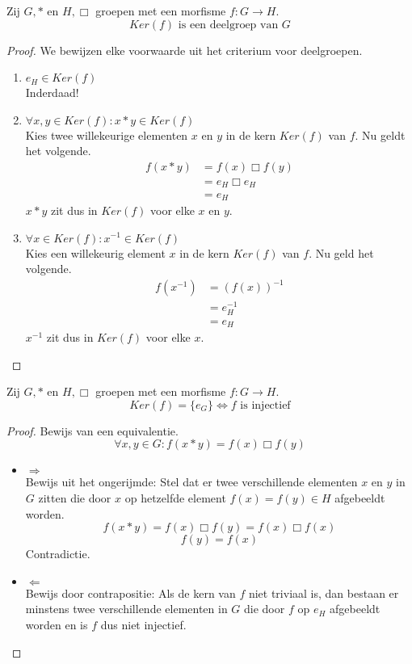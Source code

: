 \documentclass[main.tex]{subfiles}
\begin{document}
\begin{st}
  \label{st:kern-is-deelgroep}
  Zij $G,*$ en $H,\Box$ groepen met een morfisme $f: G \rightarrow H$.
  \[ Ker(f) \text{ is een deelgroep van } G \]
  \begin{proof}
    We bewijzen elke voorwaarde uit het criterium voor deelgroepen.
    \begin{enumerate}
    \item $e_{H} \in Ker(f)$\\
      Inderdaad!
    \item $\forall x,y \in Ker(f): x * y \in Ker (f)$\\
      Kies twee willekeurige elementen $x$ en $y$ in de kern $Ker(f)$ van $f$.
      Nu geldt het volgende.
      \[
      \begin{array}{rl}
      f(x * y) &= f(x) \Box f(y)\\
               &= e_{H} \Box e_{H}\\
               &= e_{H}
      \end{array}
      \]
      $x * y$ zit dus in $Ker (f)$ voor elke $x$ en $y$.
    \item $\forall x \in Ker(f): x^{-1} \in Ker (f)$\\
      Kies een willekeurig element $x$ in de kern $Ker(f)$ van $f$.
      Nu geld het volgende.
      \[
      \begin{array}{rl}
      f(x^{-1}) &= (f(x))^{-1}\\
               &= e_{H}^{-1}\\
               &= e_{H}
      \end{array}
      \]
      $x^{-1}$ zit dus in $Ker (f)$ voor elke $x$.
    \end{enumerate}
  \end{proof}
\end{st}

\begin{st}
  \label{st:kern-triviaal-asa-morfisme-injectief}
  Zij $G,*$ en $H,\Box$ groepen met een morfisme $f: G \rightarrow H$.
  \[ Ker(f) = \{e_{G}\}\Leftrightarrow f \text{ is injectief} \]

  \begin{proof}
    Bewijs van een equivalentie.
  \[ \forall x,y \in G: f(x*y) = f(x) \Box f(y) \]
    \begin{itemize}
    \item $\Rightarrow$\\
      Bewijs uit het ongerijmde: Stel dat er twee verschillende elementen $x$ en $y$ in $G$ zitten die door $x$ op hetzelfde element $f(x) = f(y) \in H$ afgebeeldt worden.
      \[ f(x*y) = f(x) \Box f(y) = f(x) \Box f(x) \]
      \[ f(y) = f(x) \]
      Contradictie.
    \item $\Leftarrow$\\
      Bewijs door contrapositie: Als de kern van $f$ niet triviaal is, dan bestaan er minstens twee verschillende elementen in $G$ die door $f$ op $e_{H}$ afgebeeldt worden en is $f$ dus niet injectief.
    \end{itemize}
  \end{proof}
\end{st}
\end{document}
